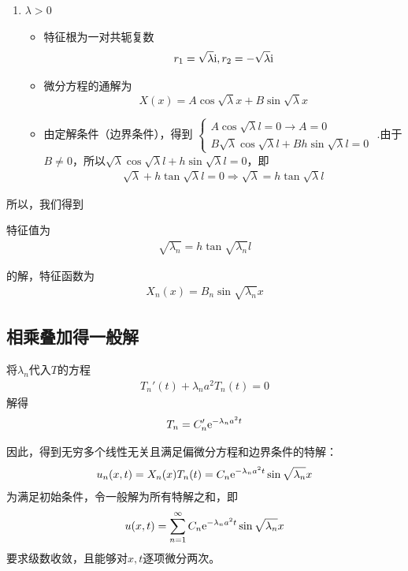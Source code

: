 \begin{enumerate}
	\item $\lambda > 0$
	\begin{itemize}
		\item 特征根为一对共轭复数
		\begin{equation*}
			r_1 = \sqrt{\lambda}{\rm{i}} , r_2 = -\sqrt{\lambda} {\rm{i}}
		\end{equation*}
		\item 微分方程的通解为
		\begin{equation}
			X(x) = A \cos \sqrt{\lambda}x + B \sin \sqrt{\lambda}x
		\end{equation}
		\item 由定解条件（边界条件），得到
		$\begin{cases}
			A\cos \sqrt{\lambda}l = 0 \rightarrow A = 0\\
			B\sqrt{\lambda}\cos \sqrt{\lambda}l + Bh \sin \sqrt{\lambda}l  = 0 
		\end{cases}$
		.由于$B \neq 0$，所以$\sqrt{\lambda}\cos \sqrt{\lambda}l + h\sin \sqrt{\lambda}l  = 0$，即
		\begin{align}
			\sqrt{\lambda} + h\tan \sqrt{\lambda}l =0 \Longrightarrow \sqrt{\lambda} = h\tan \sqrt{\lambda}l
		\end{align}
	\end{itemize}
\end{enumerate}
所以，我们得到
\begin{myitemize}
	\item 特征值为
	\begin{align}
		\sqrt{\lambda_n} = h\tan \sqrt{\lambda_n}l
	\end{align}
	\item 的解，特征函数为
	\begin{align}
		X_n(x) = B_n \sin \sqrt{\lambda_n}x
	\end{align}
\end{myitemize}
\vspace*{1em}

\subsection{相乘叠加得一般解}
将$\lambda_n$代入$T$的方程
\begin{align*}
	T_n'(t) + \lambda_n a^2 T_n(t) = 0
\end{align*}
解得
\begin{align}
	T_n = C'_n {\rm{e}}^{- \lambda_n a^2 t}
\end{align}

因此，得到无穷多个线性无关且满足偏微分方程和边界条件的特解：
\begin{equation}
	u_n(x, t) = X_n(x)T_n(t)=C_n {\rm{e}}^{- \lambda_n a^2 t} \sin \sqrt{\lambda_n}x
\end{equation}
为满足初始条件，令一般解为所有特解之和，即
\begin{align}
	u(x, t) = \sum_{n = 1}^{\infty} C_n {\rm{e}}^{- \lambda_n a^2 t} \sin \sqrt{\lambda_n}x
\end{align}
要求级数收敛，且能够对$x,t$逐项微分两次。

